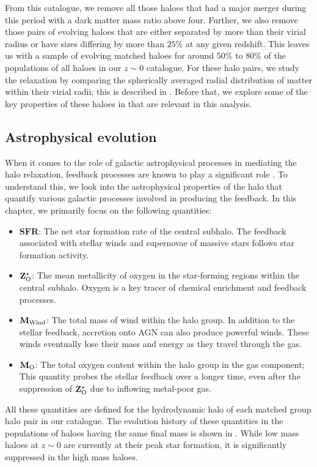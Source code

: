 From this catalogue, we remove all those haloes that had a major merger during this period with a dark matter mass ratio above four. Further, we also remove those pairs of evolving haloes that are either separated by more than their virial radius or have sizes differing by more than $25\% $ at any given redshift. This leaves us with a sample of evolving matched haloes for around $50\%$ to $80\%$ of the populations of all haloes in our $z \sim 0$ catalogue. For these halo pairs, we study the relaxation by comparing the spherically averaged radial distribution of matter within their virial radii; this is described in  . Before that, we explore some of the key properties of these haloes in  that are relevant in this analysis.

\subsection{Astrophysical evolution}
\label{sec:hal-gal-props}
When it comes to the role of galactic astrophysical processes in mediating the halo relaxation, feedback processes are known to play a significant role \cite{2011MNRAS.414..195T,2023Velmani&Paranjape}. To understand this, we look into the astrophysical properties of the halo that quantify various galactic processes involved in producing the feedback. In this chapter, we primarily focus on the  following quantities: 
\begin{itemize}
    \item \textbf{SFR}: The net star formation rate of the central subhalo. The feedback associated with stellar winds and supernovae of massive stars follows star formation activity.
    \item $\mathbf{Z^{\star}_{\rm{O}}}$: The mean metallicity of oxygen in the star-forming regions within the central subhalo. Oxygen is a key tracer of chemical enrichment and feedback processes.
    \item $\mathbf{M_{\rm{Wind}}}$: The total mass of wind within the halo group. In addition to the stellar feedback, accretion onto AGN can also produce powerful winds. These winds eventually lose their mass and energy as they travel through the gas.
    \item $\mathbf{M_{\rm{O}}}$: The total oxygen content within the halo group in the gas component; This quantity probes the stellar feedback over a longer time, even after the suppression of $\mathbf{Z^{\star}_{\rm{O}}}$ due to inflowing metal-poor gas.
\end{itemize}
All these quantities are defined for the hydrodynamic halo of each matched group halo pair in our catalogue. The evolution history of these quantities in the populations of haloes having the same final mass is shown in . While low mass haloes at $z \sim 0$ are currently at their peak star formation, it is significantly suppressed in the high mass haloes.


